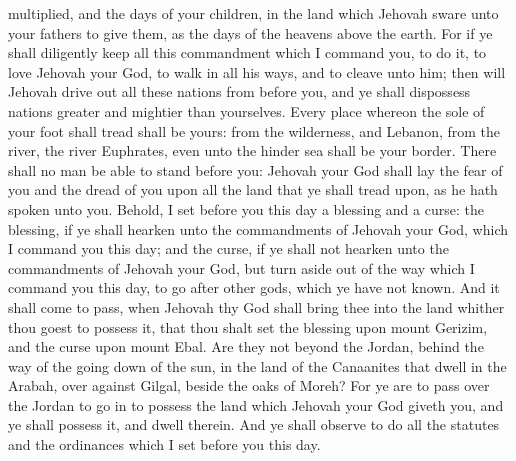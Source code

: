 multiplied, and the days of your children, in the land which Jehovah sware unto your fathers to give them, as the days of the heavens above the earth. For if ye shall diligently keep all this commandment which I command you, to do it, to love Jehovah your God, to walk in all his ways, and to cleave unto him; then will Jehovah drive out all these nations from before you, and ye shall dispossess nations greater and mightier than yourselves. Every place whereon the sole of your foot shall tread shall be yours: from the wilderness, and Lebanon, from the river, the river Euphrates, even unto the hinder sea shall be your border. There shall no man be able to stand before you: Jehovah your God shall lay the fear of you and the dread of you upon all the land that ye shall tread upon, as he hath spoken unto you.  Behold, I set before you this day a blessing and a curse: the blessing, if ye shall hearken unto the commandments of Jehovah your God, which I command you this day; and the curse, if ye shall not hearken unto the commandments of Jehovah your God, but turn aside out of the way which I command you this day, to go after other gods, which ye have not known. And it shall come to pass, when Jehovah thy God shall bring thee into the land whither thou goest to possess it, that thou shalt set the blessing upon mount Gerizim, and the curse upon mount Ebal. Are they not beyond the Jordan, behind the way of the going down of the sun, in the land of the Canaanites that dwell in the Arabah, over against Gilgal, beside the oaks of Moreh? For ye are to pass over the Jordan to go in to possess the land which Jehovah your God giveth you, and ye shall possess it, and dwell therein. And ye shall observe to do all the statutes and the ordinances which I set before you this day. 

